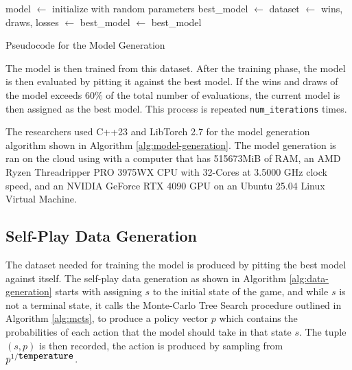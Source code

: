 \begin{algorithm}[H]
    \begin{algorithmic}[1]
          \State model $\gets$ initialize with random parameters
          \State best\_model $\gets$ 
          \Repeat
            \State dataset $\gets$ 
            \State {}
            \State wins, draws, losses $\gets$ 
                \State best\_model $\gets$ 
            \EndIf
           \State \Return best\_model
        \EndFunction
    \end{algorithmic}
    \caption{Pseudocode for the Model Generation}
    \label{alg:model-generation}
\end{algorithm}

The model is then trained from this dataset. After the training phase, the model is then evaluated by pitting it against the best model. If the wins and draws of the model exceeds $60\%$ of the total number of evaluations, the current model is then assigned as the best model. This process is repeated \verb|num_iterations| times.

The researchers used C++23 and LibTorch 2.7 for the model generation algorithm shown in Algorithm \ref{alg:model-generation}.  The model generation is ran on the cloud using \cite{vastai} %
with a computer that has 515673MiB of RAM, an AMD Ryzen Threadripper PRO 3975WX CPU with 32-Cores at 3.5000 GHz clock speed, and an NVIDIA GeForce RTX 4090 GPU on an Ubuntu 25.04 Linux Virtual Machine.

\subsection{Self-Play Data Generation}

The dataset needed for training the model is produced by pitting the best model against itself. The self-play data generation as shown in Algorithm \ref{alg:data-generation} starts with assigning $s$ to the initial state of the game, and while $s$ is not a terminal state, it calls the Monte-Carlo Tree Search procedure outlined in Algorithm \ref{alg:mcts}, to produce a policy vector $p$ which contains the probabilities of each action that the model should take in that state $s$. The tuple $(s, p)$ is then recorded, the action is produced by sampling from $p^{1/\verb|temperature|}$. 

